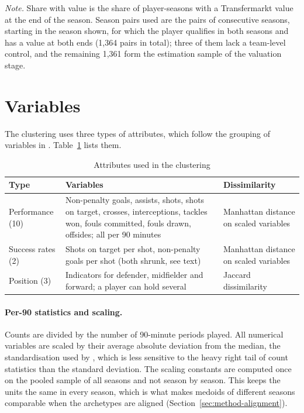 \begin{table}[ht]
	\centering
	\small
	\caption{Sample by season}
	\label{tab:sample}
	
	\par\smallskip
	\parbox{0.9\textwidth}{\footnotesize\emph{Note.} Share with value is the share of player-seasons with a Transfermarkt value at the end of the season. Season pairs used are the pairs of consecutive seasons, starting in the season shown, for which the player qualifies in both seasons and has a value at both ends (1,364 pairs in total); three of them lack a team-level control, and the remaining 1,361 form the estimation sample of the valuation stage.}
\end{table}

\section{Variables}
\label{sec:data-variables}

The clustering uses three types of attributes, which follow the grouping of variables in . Table~\ref{tab:variables} lists them.

\begin{table}[ht]
	\centering
	\small
	\caption{Attributes used in the clustering}
	\label{tab:variables}
	\begin{tabular}{p{2.6cm}p{6.2cm}p{4.8cm}}
		\toprule
		Type & Variables & Dissimilarity \\
		\midrule
		Performance (10) & Non-penalty goals, assists, shots, shots on target, crosses, interceptions, tackles won, fouls committed, fouls drawn, offsides; all per 90 minutes & Manhattan distance on scaled variables \\
		Success rates (2) & Shots on target per shot, non-penalty goals per shot (both shrunk, see text) & Manhattan distance on scaled variables \\
		Position (3) & Indicators for defender, midfielder and forward; a player can hold several & Jaccard dissimilarity \\
		\bottomrule
	\end{tabular}
\end{table}

\paragraph{Per-90 statistics and scaling.} Counts are divided by the number of 90-minute periods played. All numerical variables are scaled by their average absolute deviation from the median, the standardisation used by , which is less sensitive to the heavy right tail of count statistics than the standard deviation. The scaling constants are computed once on the pooled sample of all seasons and not season by season. This keeps the units the same in every season, which is what makes medoids of different seasons comparable when the archetypes are aligned (Section~\ref{sec:method-alignment}).

